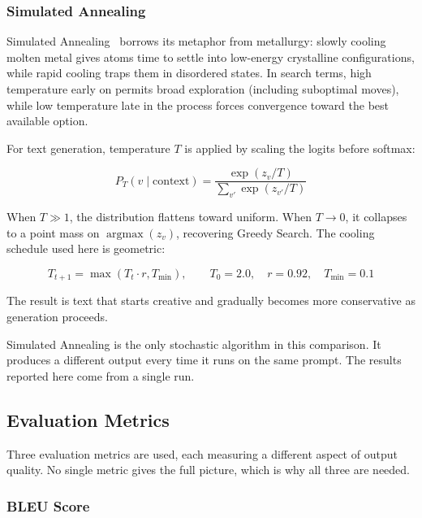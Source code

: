 \documentclass[12pt]{article}
\begin{document}
	\subsubsection{Simulated Annealing}
	\label{sec:sa_theory}
	
	Simulated Annealing~\cite{kirkpatrick1983annealing} borrows its metaphor from metallurgy: slowly cooling molten metal gives atoms time to settle into low-energy crystalline configurations, while rapid cooling traps them in disordered states. In search terms, high temperature early on permits broad exploration (including suboptimal moves), while low temperature late in the process forces convergence toward the best available option.
	
	For text generation, temperature $T$ is applied by scaling the logits before softmax:
	
	\begin{equation}
		P_T(v \mid \text{context}) = \frac{\exp(z_v / T)}{\sum_{v'} \exp(z_{v'} / T)}
		\label{eq:sa_prob}
	\end{equation}
	
	When $T \gg 1$, the distribution flattens toward uniform. When $T \to 0$, it collapses to a point mass on $\operatorname{argmax}(z_v)$, recovering Greedy Search. The cooling schedule used here is geometric:
	
	\begin{equation}
		T_{t+1} = \max(T_t \cdot r, T_{\min}), \qquad T_0 = 2.0, \quad r = 0.92, \quad T_{\min} = 0.1
		\label{eq:cooling}
	\end{equation}
	
	The result is text that starts creative and gradually becomes more conservative as generation proceeds.
	
	Simulated Annealing is the only stochastic algorithm in this comparison. It produces a different output every time it runs on the same prompt. The results reported here come from a single run.
	
	\subsection{Evaluation Metrics}
	\label{sec:metrics}
	
	Three evaluation metrics are used, each measuring a different aspect of output quality. No single metric gives the full picture, which is why all three are needed.
	
	\subsubsection{BLEU Score}
	
\end{document}
